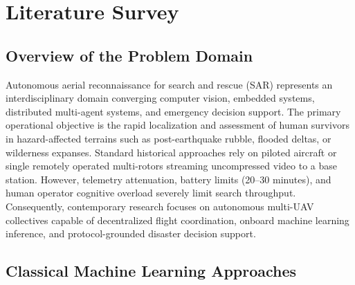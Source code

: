 \chapter{Literature Survey}

\section{Overview of the Problem Domain}

Autonomous aerial reconnaissance for search and rescue (SAR) represents an interdisciplinary domain converging computer vision, embedded systems, distributed multi-agent systems, and emergency decision support. The primary operational objective is the rapid localization and assessment of human survivors in hazard-affected terrains such as post-earthquake rubble, flooded deltas, or wilderness expanses. Standard historical approaches rely on piloted aircraft or single remotely operated multi-rotors streaming uncompressed video to a base station. However, telemetry attenuation, battery limits (20--30 minutes), and human operator cognitive overload severely limit search throughput. Consequently, contemporary research focuses on autonomous multi-UAV collectives capable of decentralized flight coordination, onboard machine learning inference, and protocol-grounded disaster decision support.

\section{Classical Machine Learning Approaches}


